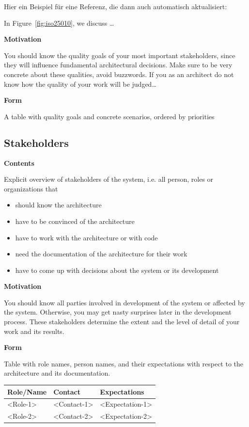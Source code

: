 \documentclass[12pt,a4paper]{article}
\newcommand{\minititle}[1]{%
  \par\addvspace{0.6\baselineskip}%
  \noindent\textbf{#1}\par\nobreak%
  \noindent\ignorespaces%
}
\begin{document}
Hier ein Beispiel für eine Referenz, die dann auch automatisch aktualisiert:

In Figure~\ref{fig:iso25010}, we discuss \dots


\vspace{0.6cm}

\minititle{Motivation}
You should know the quality goals of your most important stakeholders, since they will influence fundamental architectural decisions. Make sure to be very concrete about these qualities, avoid buzzwords. If you as an architect do not know how the quality of your work will be judged\ldots

\minititle{Form}
A table with quality goals and concrete scenarios, ordered by priorities

\subsection{Stakeholders}


\minititle{Contents}
Explicit overview of stakeholders of the system, i.e. all person, roles or organizations that
\begin{itemize}
  \item should know the architecture
  \item have to be convinced of the architecture
  \item have to work with the architecture or with code
  \item need the documentation of the architecture for their work
  \item have to come up with decisions about the system or its development
\end{itemize}

\minititle{Motivation}
You should know all parties involved in development of the system or affected by the system. Otherwise, you may get nasty surprises later in the development process. These stakeholders determine the extent and the level of detail of your work and its results.

\minititle{Form}
Table with role names, person names, and their expectations with respect to the architecture and its documentation.

\begin{longtable}{p{3cm} p{4cm} p{7cm}}
\toprule
Role/Name & Contact & Expectations \\
\midrule
\textless Role-1\textgreater & \textless Contact-1\textgreater & \textless Expectation-1\textgreater \\
\textless Role-2\textgreater & \textless Contact-2\textgreater & \textless Expectation-2\textgreater \\
\bottomrule
\end{longtable}
\end{document}

